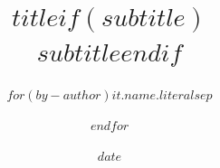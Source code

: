 \title{$title$$if(subtitle)$\\\large $subtitle$$endif$}
\author{$for(by-author)$$it.name.literal$$sep$ \and $endfor$}
\date{$date$}
\maketitle
